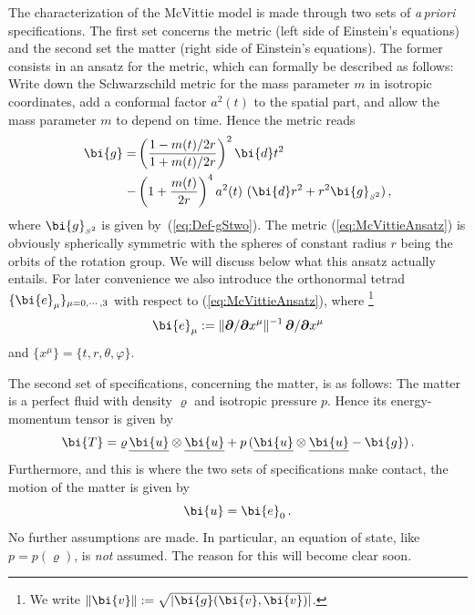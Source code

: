 \documentclass
[rmp,aps,twocolumn,showpacs,preprintnumbers,amsmath,amssymb]{revtex4}
\theoremstyle{plain}
\theoremstyle{definition}
\theoremstyle{remark}
\newcommand{\ul}[1]{\underline{#1}}
\newcommand{\sss}{\scriptscriptstyle}
\newcommand{\norm}[1]{\lVert#1\rVert}         %
\newcommand{\bpartial}{\boldsymbol{\partial}} %
\newcommand{\ed}{\bi{d}}                      %
\newcommand{\Stwo}{{S^2}}                         %
\newcommand{\sStwo}{{\sss \Stwo}}                 %
\newcommand{\gStwo}{\g_\sStwo}                    %
\newcommand{\g}{\bg}                            %
\newcommand{\be}{\bi{e}}
\newcommand{\bg}{\bi{g}}
\newcommand{\bu}{\bi{u}}
\newcommand{\bv}{\bi{v}}
\newcommand{\bT}{\bi{T}}
\begin{document}
The characterization of the McVittie model is made through two sets
of \emph{a\,priori} specifications. The first set concerns the metric 
(left side of Einstein's equations) and the second set the matter 
(right side of Einstein's equations). The former consists in an 
ansatz for the metric, which can formally be described as follows:
Write down the Schwarzschild metric for the mass parameter $m$ in 
isotropic coordinates, add a conformal factor $a^2(t)$ to the 
spatial part, and allow the mass parameter $m$ to depend on time. 
Hence the metric reads    
%
\begin{equation}\label{eq:McVittieAnsatz}
\begin{split}
\g =&\left( \frac{1-m(t)/2r}{1+m(t)/2r} \right)^2 \ed t^2\\
   -&\left( 1+\frac{m(t)}{2r} \right)^4 a^2(t)\ (\ed r^2 + r^2 \gStwo)\,,
\end{split}
\end{equation}
%
where $\gStwo$ is given by~(\ref{eq:Def-gStwo}). The metric 
(\ref{eq:McVittieAnsatz}) is obviously spherically symmetric with 
the spheres of constant radius $r$ being the orbits of the rotation 
group. We will discuss below what this ansatz actually entails. 
For later convenience we also introduce the orthonormal tetrad 
$\{\be_\mu\}_{\mu=0,\cdots, 3}$ with respect to 
(\ref{eq:McVittieAnsatz}), where%
\footnote{We write $\norm{\bv}:=\sqrt{\vert\bg(\bv,\bv)\vert}$.} 
%
\begin{equation}\label{eq:DefOrthnFrame}
  \be_\mu := \norm{\bpartial/\bpartial x^\mu}^{-1}\,\bpartial/\bpartial x^\mu
\end{equation}
%
and $\{x^\mu\}=\{t,r,\theta,\varphi\}$. 

The second set of specifications, concerning the matter, is as follows: 
The matter is a perfect fluid with density $\varrho$ and isotropic 
pressure $p$. Hence its energy-momentum tensor is given by
%
\begin{equation}\label{er:EMTensorForMcVittie}
  \bT = \varrho\,\ul\bu\otimes\ul\bu +p\,(\ul\bu\otimes\ul\bu-\bg)\,.
\end{equation}
%
Furthermore, and this is where the two sets of specifications make 
contact, the motion of the matter is given by  
%
\begin{equation}\label{eq:u-McVittie}
  \bu = \be_0 \,.
\end{equation}
%
No further assumptions are made. In particular, an equation of state, 
like $p=p(\varrho)$, is \emph{not} assumed. The reason for this 
will become clear soon. 
\end{document}
